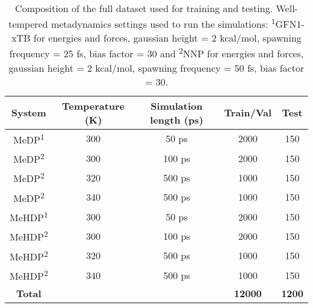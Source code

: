 \begin{table}[htbp]
    \centering
    \caption{Composition of the full dataset used for training and testing. Well-tempered metadynamics settings used to run the simulations: \textsuperscript{1}GFN1-xTB for energies and forces, gaussian height = 2 kcal/mol, spawning frequency = 25 fs, bias factor = 30 and  \textsuperscript{2}NNP for energies and forces, gaussian height = 2 kcal/mol, spawning frequency = 50 fs, bias factor = 30.}
    \label{tab:full_dataset}
    \begin{tabular}{ccccc}
    \toprule
    \textbf{System} & \textbf{Temperature (K)} & \textbf{Simulation length (ps)} & \textbf{Train/Val} & \textbf{Test} \\
    \midrule
    MeDP\textsuperscript{1}  & 300 & 50 ps   & 2000 & 150 \\
    MeDP\textsuperscript{2}  & 300 & 100 ps & 2000 & 150 \\
    MeDP\textsuperscript{2}  & 320 & 500 ps  & 1000 & 150 \\
    MeDP\textsuperscript{2}  & 340 & 500 ps  & 1000 & 150 \\
    MeHDP\textsuperscript{1} & 300 & 50 ps  & 2000 & 150 \\
    MeHDP\textsuperscript{2} & 300 & 100 ps & 2000 & 150 \\
    MeHDP\textsuperscript{2} & 320 & 500 ps  & 1000 & 150 \\
    MeHDP\textsuperscript{2} & 340 & 500 ps  & 1000 & 150 \\
    \midrule
    \textbf{Total} & & & \textbf{12000} & \textbf{1200} \\
    \bottomrule
    \end{tabular}
\end{table}
